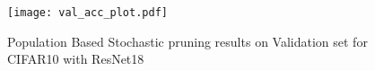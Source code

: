 \begin{figure}[htpb]
    \centering
    \texttt{[image: val\_acc\_plot.pdf]}
    \caption{Population Based Stochastic pruning results on Validation set for
    CIFAR10 with ResNet18 }
    \label{fig:ValidationAccuracy}
\end{figure}








 














